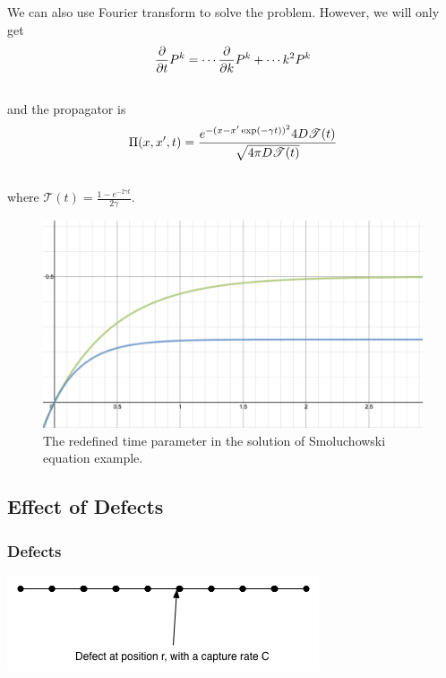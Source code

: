 \documentclass[letterpaper,10pt,english]{sphinxmanual}
\begin{document}
We can also use Fourier transform to solve the problem. However, we will only get
\begin{gather}
\begin{split}\frac{\partial}{\partial t} P^k = \cdots \frac{\partial}{\partial k} P^k  + \cdots k^2 P^k\end{split}\notag\\\begin{split}\end{split}\notag
\end{gather}
and the propagator is
\begin{gather}
\begin{split}\Pi(x,x',t) = \frac{e^{-(x - x' \exp(-\gamma t))^2}{4D\mathscr T(t)} }{\sqrt{4 \pi D \mathscr T(t)}}\end{split}\notag\\\begin{split}\end{split}\notag
\end{gather}
where $\mathscr T(t) = \frac{1-e^{-2\gamma t}}{2\gamma}$.
\begin{figure}[htbp]
\centering
\capstart

\includegraphics[width=0.900\linewidth]{smoluTime.png}
\caption{The redefined time parameter in the solution of Smoluchowski equation example.}\end{figure}


\subsection{Effect of Defects}
\label{nonequilibrium/effectOfDefects:effect-of-defects}\label{nonequilibrium/effectOfDefects::doc}

\subsubsection{Defects}
\label{nonequilibrium/effectOfDefects:index-0}\label{nonequilibrium/effectOfDefects:defects}
{\hfill\includegraphics{effectsofDefects.png}\hfill}
\end{document}
